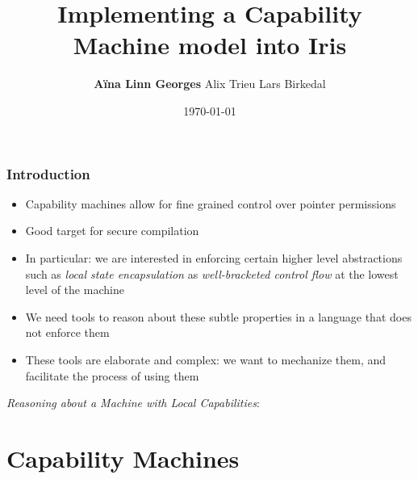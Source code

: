 \documentclass{beamer}
\title[Capability Machine in Iris]{Implementing a Capability Machine model into Iris} %
\author{\textbf{A\"{i}na Linn Georges} \hspace{1cm} Alix Trieu \hspace{1cm} Lars Birkedal} %
\institute[Aarhus University] %
{
Aarhus University \\ %
\medskip
\textit{ageorges@cs.au.dk} %
}
\date{\today} %
\begin{document}
\begin{frame}
\titlepage %
\end{frame}

\begin{frame}
\frametitle{Introduction}

\begin{itemize}
	\item<1> Capability machines allow for fine grained control over pointer permissions 
	\item<2> Good target for secure compilation
	\item<3> In particular: we are interested in enforcing certain higher level abstractions such as \textit{local state encapsulation} as \textit{well-bracketed control flow} at the lowest level of the machine
	\item<4> We need tools to reason about these subtle properties in a language that does not enforce them
	\item<5> These tools are elaborate and complex: we want to mechanize them, and facilitate the process of using them
\end{itemize}

\textit{Reasoning about a Machine with Local Capabilities}: \cite{p1}

\end{frame}



\section{Capability Machines} %
\end{document}
